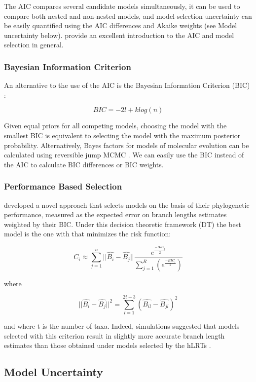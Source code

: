 The AIC compares several candidate models simultaneously, it can be used to
compare both nested and non-nested models, and model-selection uncertainty can
be easily quantified using the AIC differences and Akaike weights (see Model uncertainty below).
\citet{Burnham-2003} provide an excellent introduction to the AIC and model selection in general.

\subsubsection{Bayesian Information Criterion}
\label{sec:bic}

An alternative to the use of the AIC is the Bayesian Information Criterion (BIC) \citep{Schwarz-1978}:

\[
BIC=-2l + k log(n)
\]

Given equal priors for all competing models, choosing the model with the smallest BIC
is equivalent to selecting the model with the maximum posterior probability.
Alternatively, Bayes factors for models of molecular evolution can be calculated
using reversible jump MCMC \citep{Huelsenbeck-2004}.
We can easily use the BIC instead of the AIC to calculate BIC differences or BIC weights.

\subsubsection{Performance Based Selection}
\label{sec:dt}

\citet{Minin-2003} developed a novel approach that selects models on the basis
of their phylogenetic performance, measured as the expected error on branch
lengths estimates weighted by their BIC. Under this decision theoretic framework (DT)
the best model is the one with that minimizes the risk function:

\[
C_i \approx \sum_{j=1}^n||\hat{B_i} - \hat{B_j}||\frac{e^{\frac{-BIC_j}{2}}}{\sum_{j=1}^R(e^\frac{-BIC_i}{2})}
\]

where

\[
||\hat{B_i} - \hat{B_j}||^2 = \sum_{l=1}^{2t-3}(\hat{B_{il}} - \hat{B_{jl}})^2
\]

and where t is the number of taxa. Indeed, simulations suggested that models
selected with this criterion result in slightly more accurate branch length
estimates than those obtained under models selected by the hLRTs \citep{Minin-2003, Abdo-2005}.

\subsection{Model Uncertainty}

